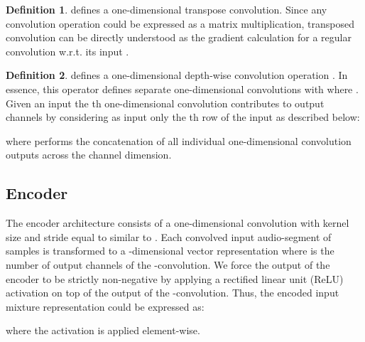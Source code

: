 \documentclass{article}
\theoremstyle{definition}
\newtheorem{definition}{Definition}[section]
\begin{document}
\begin{definition}
 defines a one-dimensional transpose convolution. Since any convolution operation could be expressed as a matrix multiplication, transposed convolution can be directly understood as the gradient calculation for a regular convolution w.r.t. its input \cite{Simonyan2013DeepIC_transposeconvolution}.
\end{definition}

\begin{definition}
 defines a one-dimensional depth-wise convolution operation \cite{sifre2014depthwiseseparable}. In essence, this operator defines  separate one-dimensional convolutions  with  where . Given an input  the th one-dimensional convolution contributes to  output channels by considering as input only the th row of the input as described below: 

where  performs the concatenation of all individual one-dimensional convolution outputs across the channel dimension. 
\end{definition}


\subsection{Encoder}
\label{sec:net_arch:encoder}
The encoder  architecture consists of a one-dimensional convolution with kernel size  and stride equal to  similar to \cite{luo2019convTasNet}. Each convolved input audio-segment of  samples is transformed to a -dimensional vector representation where  is the number of output channels of the -convolution. We force the output of the encoder to be strictly non-negative by applying a rectified linear unit (ReLU) activation on top of the output of the -convolution. Thus, the encoded input mixture representation could be expressed as:

where the activation  is applied element-wise.
\end{document}
